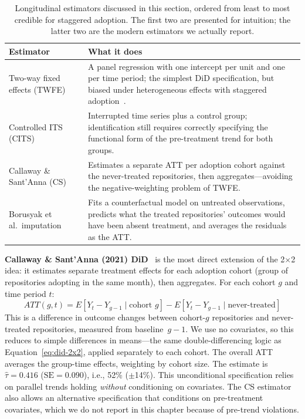 \begin{table}[t]
\centering
\caption{Longitudinal estimators discussed in this section, ordered from least to most credible for staggered adoption.
The first two are presented for intuition; the latter two are the modern estimators we actually report.}
\label{tab:longitudinal-estimators}
\footnotesize
\begin{tabularx}{\linewidth}{@{} p{4.0cm} X @{}}
\toprule
\textbf{Estimator} & \textbf{What it does} \\
\midrule
Two-way fixed effects (TWFE)
  & A panel regression with one intercept per unit and one per time period; the simplest DiD specification, but biased under heterogeneous effects with staggered adoption~\cite{goodman2021difference, dechaisemartin2020two}. \\
\addlinespace
Controlled ITS (CITS)~\cite{bernal2017interrupted}
  & Interrupted time series plus a control group; identification still requires correctly specifying the functional form of the pre-treatment trend for both groups. \\
\addlinespace
Callaway \& Sant'Anna (CS)~\cite{callaway2021difference}
  & Estimates a separate ATT per adoption cohort against the never-treated repositories, then aggregates---avoiding the negative-weighting problem of TWFE. \\
\addlinespace
Borusyak et al.\ imputation~\cite{borusyak2024revisiting}
  & Fits a counterfactual model on untreated observations, predicts what the treated repositories' outcomes would have been absent treatment, and averages the residuals as the ATT. \\
\bottomrule
\end{tabularx}
\end{table}

\textbf{Callaway \& Sant'Anna (2021) DiD}~\cite{callaway2021difference} is the most direct extension of the 2$\times$2 idea: it estimates separate treatment effects for each adoption cohort (group of repositories adopting in the same month), then aggregates.
For each cohort $g$ and time period $t$:
\begin{equation}
\label{eq:cs-att-gt}
ATT(g, t) = E[Y_t - Y_{g-1} \mid \text{cohort } g] - E[Y_t - Y_{g-1} \mid \text{never-treated}]
\end{equation}
This is a difference in outcome changes between cohort-$g$ repositories and never-treated repositories, measured from baseline~$g\!-\!1$.
We use no covariates, so this reduces to simple differences in means---the same double-differencing logic as Equation~\ref{eq:did-2x2}, applied separately to each cohort.
The overall ATT averages the group-time effects, weighting by cohort size.
The estimate is $\hat{\tau} = 0.416$ ($\text{SE} = 0.090$), i.e., 52\% ($\pm$14\%).
This unconditional specification relies on parallel trends holding \emph{without} conditioning on covariates.
The CS estimator also allows an alternative specification that conditions on pre-treatment covariates, which we do not report in this chapter because of pre-trend violations.

